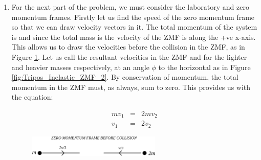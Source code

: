 \begin{problem}
{\begin{enumerate}
Therefore the final kinetic energy of the system is . The initial kinetic energy of the system is simply the sum of the two particles' energies:
\begin{equation*}
\frac{1}{2}m|\vtr{v}_{1}|^2+\frac{1}{2}m|\vtr{v}_{2}|^2
\end{equation*}

Therefore the amount of kinetic energy available for conversion to other forms of energy is:
\begin{equation*}
\frac{1}{2}m\left(|\vtr{v}_{1}|^2+|\vtr{v}_{2}|^2\right)-\frac{1}{4}m|\vtr{v}_{1}+\vtr{v}_{2}|^2
\end{equation*}
 which can be rewritten as .

\item For the next part of the problem, we must consider the laboratory and zero momentum frames. Firstly let us find the speed of the zero momentum frame so that we can draw velocity vectors in it. The total momentum of the system is  and since the total mass is  the velocity of the ZMF is  along the +ve x-axis. This allows us to draw the velocities before the collision in the ZMF, as in Figure \ref{fig:Tripos_Inelastic_ZMF_1}. Let us call the resultant velocities in the ZMF  and  for the lighter and heavier masses respectively, at an angle $\phi$ to the horizontal as in Figure \ref{fig:Tripos_Inelastic_ZMF_2}. By conservation of momentum, the total momentum in the ZMF must, as always, sum to zero. This provides us with the equation:

\begin{eqnarray}
mv_1 &=& 2mv_2 \nonumber \\
v_1 &=& 2v_2
\end{eqnarray}


\begin{figure}[h]
	\centering
	\includegraphics[width=0.6\textwidth]{../../../figures/dynamics_tripos_inelastic_zmf_1.svg}
	\caption{}\label{fig:Tripos_Inelastic_ZMF_1}
\end{figure}


\end{enumerate}}
\end{problem}
